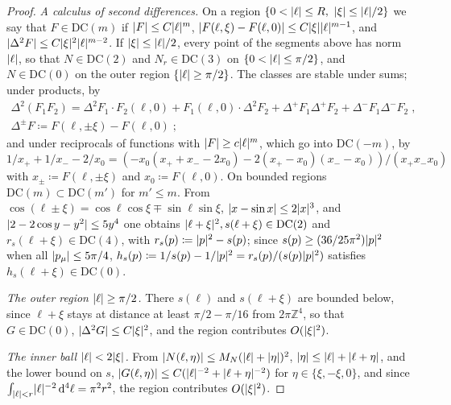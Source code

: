 \documentclass[11pt]{preprint}
\newcommand{\dd}{\mathrm{d}}
\DeclarePairedDelimiter{\abs}{\lvert}{\rvert}
\numberwithin{equation}{section}
\theoremstyle{definition}
\theoremstyle{remark}
\theoremstyle{plain}
\begin{document}
\begin{proof}
\emph{A calculus of second differences.} On a region $\{ 0 < \abs{\ell} \leq R,\ \abs{\xi} \leq \abs{\ell}/2 \}$ we say that $F \in \mathrm{DC}(m)$ if $\abs{F} \leq C\abs{\ell}^m$, $\abs{F(\ell, \xi) - F(\ell, 0)} \leq C\abs{\xi}\abs{\ell}^{m-1}$, and $\abs{\Delta^2F} \leq C\abs{\xi}^2\abs{\ell}^{m-2}$. If $\abs{\xi} \leq \abs{\ell}/2$, every point of the segments above has norm $\abs{\ell}$, so that $N \in \mathrm{DC}(2)$ and $N_r \in \mathrm{DC}(3)$ on $\{ 0 < \abs{\ell} \leq \pi/2 \}$, and $N \in \mathrm{DC}(0)$ on the outer region $\{ \abs{\ell} \geq \pi/2 \}$. The classes are stable under sums; under products, by
\begin{equation}\label{eq:product-difference}
    \begin{gathered}
        \Delta^2(F_1F_2) = \Delta^2F_1\cdot F_2(\ell, 0) + F_1(\ell, 0)\cdot\Delta^2F_2 + \Delta^+F_1\Delta^+F_2 + \Delta^-F_1\Delta^-F_2\;,
        \\
        \Delta^\pm F \coloneqq F(\ell, \pm\xi) - F(\ell, 0)\;;
    \end{gathered}
\end{equation}
and under reciprocals of functions with $\abs{F} \geq c\abs{\ell}^m$, which go into $\mathrm{DC}(-m)$, by $1/x_+ + 1/x_- - 2/x_0 = (-x_0(x_+ + x_- - 2x_0) - 2(x_+ - x_0)(x_- - x_0))/(x_+x_-x_0)$ with $x_\pm \coloneqq F(\ell, \pm\xi)$ and $x_0 \coloneqq F(\ell, 0)$. On bounded regions $\mathrm{DC}(m) \subset \mathrm{DC}(m')$ for $m' \leq m$. From $\cos(\ell \pm \xi) = \cos\ell\cos\xi \mp \sin\ell\sin\xi$, $\abs{x - \sin x} \leq 2\abs{x}^3$, and $\abs{2 - 2\cos y - y^2} \leq 5y^4$ one obtains $\abs{\ell + \xi}^2, s(\ell + \xi) \in \mathrm{DC}(2)$ and $r_s(\ell + \xi) \in \mathrm{DC}(4)$, with $r_s(p) \coloneqq \abs{p}^2 - s(p)$; since $s(p) \geq (36/25\pi^2)\abs{p}^2$ when all $\abs{p_\mu} \leq 5\pi/4$, $h_s(p) \coloneqq 1/s(p) - 1/\abs{p}^2 = r_s(p)/(s(p)\abs{p}^2)$ satisfies $h_s(\ell + \xi) \in \mathrm{DC}(0)$.

\emph{The outer region $\abs{\ell} \geq \pi/2$.} There $s(\ell)$ and $s(\ell + \xi)$ are bounded below, since $\ell + \xi$ stays at distance at least $\pi/2 - \pi/16$ from $2\pi\mathbb Z^4$, so that $G \in \mathrm{DC}(0)$, $\abs{\Delta^2G} \leq C\abs{\xi}^2$, and the region contributes $O(\abs{\xi}^2)$.

\emph{The inner ball $\abs{\ell} < 2\abs{\xi}$.} From $\abs{N(\ell, \eta)} \leq M_N(\abs{\ell} + \abs{\eta})^2$, $\abs{\eta} \leq \abs{\ell} + \abs{\ell + \eta}$, and the lower bound on $s$, $\abs{G(\ell, \eta)} \leq C(\abs{\ell}^{-2} + \abs{\ell + \eta}^{-2})$ for $\eta \in \{ \xi, -\xi, 0 \}$, and since $\int_{\abs{\ell}<r}\abs{\ell}^{-2}\,\dd^4\ell = \pi^2r^2$, the region contributes $O(\abs{\xi}^2)$.


\end{proof}
\end{document}

